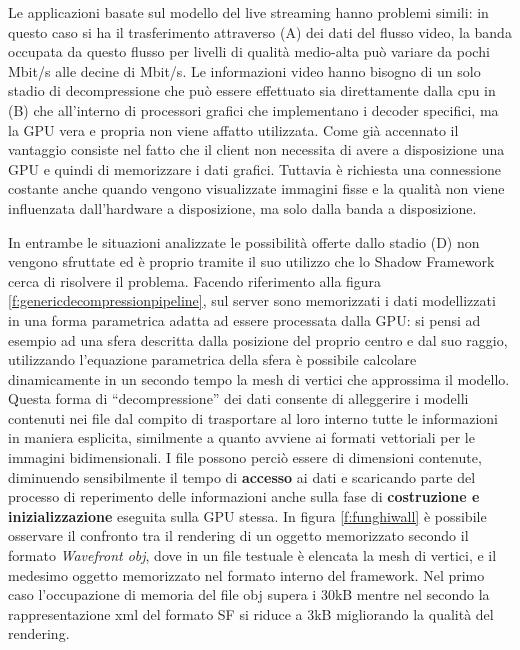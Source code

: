 Le applicazioni basate sul modello del live streaming hanno problemi simili: in questo caso si ha il trasferimento attraverso (A) dei dati del flusso video, la banda occupata da questo flusso per livelli di qualit\`a medio-alta pu\`o variare da pochi Mbit/s alle decine di Mbit/s. Le informazioni video hanno bisogno di un solo stadio di decompressione che pu\`o essere effettuato sia direttamente dalla cpu in (B) che all'interno di processori grafici che implementano i decoder specifici, ma la \ac{GPU} vera e propria non viene affatto utilizzata. 
Come gi\`a accennato il vantaggio consiste nel fatto che il client non necessita di avere a disposizione una \ac{GPU} e quindi di memorizzare i dati grafici. Tuttavia \`e richiesta una connessione costante anche quando vengono visualizzate immagini fisse e la qualit\`a non viene influenzata dall'hardware a disposizione, ma solo dalla banda a disposizione.

In entrambe le situazioni analizzate le possibilit\`a offerte dallo stadio (D) non vengono sfruttate ed \`e proprio tramite il suo utilizzo che lo Shadow Framework cerca di risolvere il problema. Facendo riferimento alla figura \ref{f:genericdecompressionpipeline}, sul server sono memorizzati i dati modellizzati in una forma parametrica adatta ad essere processata dalla \ac{GPU}: si pensi ad esempio ad una sfera descritta dalla posizione del proprio centro e dal suo raggio, utilizzando l'equazione parametrica della sfera \`e possibile calcolare dinamicamente in un secondo tempo la mesh di vertici che approssima il modello. Questa forma di ``decompressione'' dei dati consente di alleggerire i modelli contenuti nei file dal compito di trasportare al loro interno tutte le informazioni in maniera esplicita, similmente a quanto avviene ai formati vettoriali per le immagini bidimensionali. I file possono perci\`o essere di dimensioni contenute, diminuendo sensibilmente il tempo di \textbf{accesso} ai dati e scaricando parte del processo di reperimento delle informazioni anche sulla fase di \textbf{costruzione e inizializzazione} eseguita sulla \ac{GPU} stessa. In figura \ref{f:funghiwall} \`e possibile osservare il confronto tra il rendering di un oggetto memorizzato secondo il formato \textit{Wavefront obj}, dove in un file testuale \`e elencata la mesh di vertici, e il medesimo oggetto memorizzato nel formato interno del framework. Nel primo caso l'occupazione di memoria del file obj supera i 30\ac{kB} mentre nel secondo la rappresentazione xml del formato \ac{SF} si riduce a 3\ac{kB} migliorando la qualit\`a del rendering.

